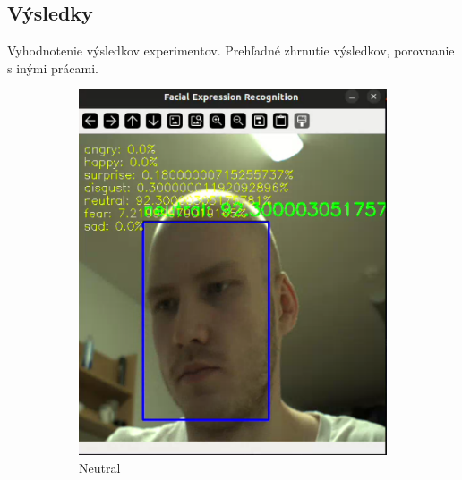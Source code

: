 \begin{itemize}
\subsection{Výsledky} Vyhodnotenie výsledkov experimentov. Prehľadné zhrnutie výsledkov, porovnanie s inými prácami.
\begin{figure}[!htpb]
    \centering
    \begin{subfigure}[b]{0.45\textwidth}
        \centering
        \includegraphics[width=\textwidth]{img/neutral.png}
        \caption{Neutral}
        \label{fig:neutral}
    \end{subfigure}
    \hfill
    \begin{subfigure}[b]{0.45\textwidth}
        \centering

\end{subfigure}
\end{figure}
\end{itemize}
